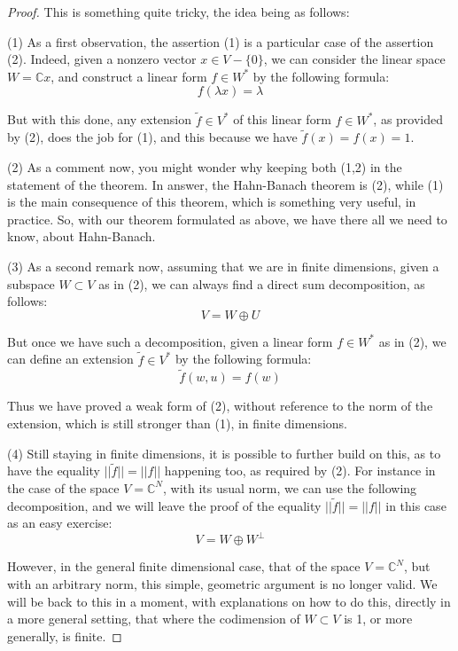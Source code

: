\documentclass[12pt]{amsbook}
\begin{document}
\begin{proof}
This is something quite tricky, the idea being as follows:

\medskip

(1) As a first observation, the assertion (1) is a particular case of the assertion (2). Indeed, given a nonzero vector $x\in V-\{0\}$, we can consider the linear space $W=\mathbb Cx$, and construct a linear form $f\in W^*$ by the following formula:
$$f(\lambda x)=\lambda$$

But with this done, any extension $\tilde{f}\in V^*$ of this linear form $f\in W^*$, as provided by (2), does the job for (1), and this because we have $\tilde{f}(x)=f(x)=1$.

\medskip

(2) As a comment now, you might wonder why keeping both (1,2) in the statement of the theorem. In answer, the Hahn-Banach theorem is (2), while (1) is the main consequence of this theorem, which is something very useful, in practice. So, with our theorem formulated as above, we have there all we need to know, about Hahn-Banach.

\medskip

(3) As a second remark now, assuming that we are in finite dimensions, given a subspace $W\subset V$ as in (2), we can always find a direct sum decomposition, as follows:
$$V=W\oplus U$$

But once we have such a decomposition, given a linear form $f\in W^*$ as in (2), we can define an extension $\tilde{f}\in V^*$  by the following formula:
$$\tilde{f}(w,u)=f(w)$$

Thus we have proved a weak form of (2), without reference to the norm of the extension, which is still stronger than (1), in finite dimensions. 

\medskip

(4) Still staying in finite dimensions, it is possible to further build on this, as to have the equality $||\tilde{f}||=||f||$ happening too, as required by (2). For instance in the case of the space $V=\mathbb C^N$, with its usual norm, we can use the following decomposition, and we will leave the proof of the equality $||\tilde{f}||=||f||$ in this case as an easy exercise:
$$V=W\oplus W^\perp$$

However, in the general finite dimensional case, that of the space $V=\mathbb C^N$, but with an arbitrary norm, this simple, geometric argument is no longer valid. We will be back to this in a moment, with explanations on how to do this, directly in a more general setting, that where the codimension of $W\subset V$ is 1, or more generally, is finite.


\end{proof}
\end{document}
